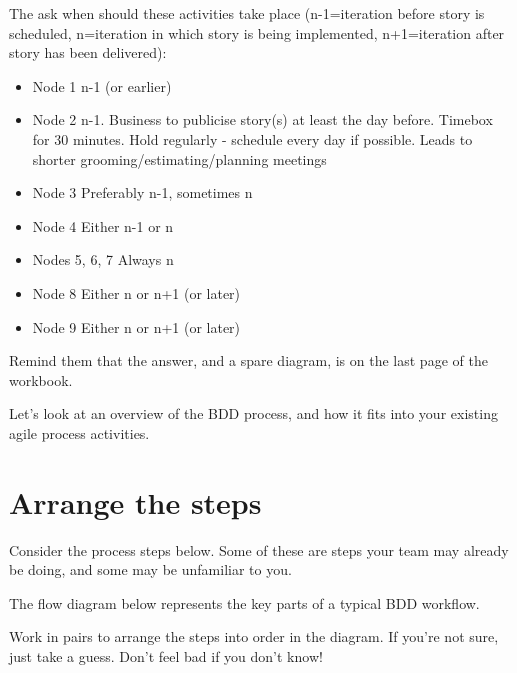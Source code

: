     The ask when should these activities take place (n-1=iteration before story is scheduled, n=iteration in which story is being implemented, n+1=iteration after story has been delivered):
    
     \begin{itemize}
        \item Node 1 n-1 (or earlier)        
        \item Node 2 n-1. Business to publicise story(s) at least the day before. Timebox for 30 minutes. Hold regularly - schedule every day if possible. Leads to shorter grooming/estimating/planning meetings
        \item Node 3 Preferably n-1, sometimes n
        \item Node 4 Either n-1 or n 
        \item Nodes 5, 6, 7 Always n        
        \item Node 8 Either n or n+1 (or later)
        \item Node 9 Either n or n+1 (or later)
    \end{itemize}
   
    
    Remind them that the answer, and a spare diagram, is on the last page of the workbook.
\fi 

\ifcontent

    Let's look at an overview of the BDD process, and how it fits into your existing agile process activities.
    
    \section*{Arrange the steps}
    
    Consider the process steps below. Some of these are steps your team may already be doing, and some may be unfamiliar to you.
    
    The flow diagram below represents the key parts of a typical BDD workflow.
    
    Work in pairs to arrange the steps into order in the diagram. If you're not sure, just take a guess. Don't feel bad if you don't know!
    
